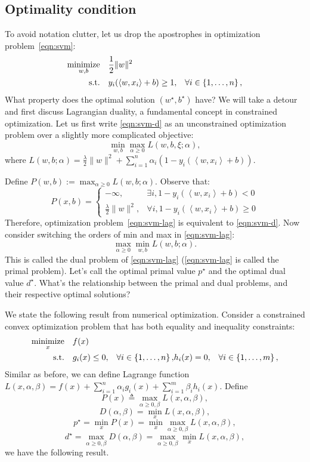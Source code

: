 \documentclass{article}
\DeclareMathOperator*{\minimize}{{\rm minimize}}
\DeclareMathOperator*{\st}{{\rm s.t.}}
\newcommand{\defeq}{\triangleq}
\newcommand{\inner}[2]{\left\langle #1,#2 \right\rangle}
\begin{document}
\subsection{Optimality condition}
To avoid notation clutter, let us drop the apostrophes in optimization problem~\eqref{eqn:svm}:
\begin{align}
  \minimize_{w,b} \quad & \frac12 \| w \|^2 & \label{eqn:svm-d} \\
    \st \quad &  y_i(\inner{w}{x_i} + b) \geq 1, &\forall i \in \cbr{1,\ldots,n}, \nonumber
\end{align}
What property does the optimal solution $(w^\star, b^\star)$ have? We will take a detour and first discuss Lagrangian duality, a fundamental concept in constrained optimization. Let us first write \eqref{eqn:svm-d} as an unconstrained optimization problem over a slightly more complicated objective:
\begin{equation}
   \min_{w,b} \max_{\alpha \geq 0} L(w,b,\xi;\alpha),
   \label{eqn:svm-lag}
\end{equation}
where $L(w,b;\alpha) = \frac \lambda 2 \| w \|^2 + \sum_{i=1}^n \alpha_i (1 - y_i(\inner{w}{x_i} + b))$.

Define $P(w,b) := \max_{\alpha \geq 0} L(w,b;\alpha)$. Observe that:
\[
P(x,b) =
\begin{cases}
-\infty, & \exists i, 1 - y_i(\inner{w}{x_i} + b) < 0 \\
\frac \lambda 2 \| w \|^2, & \forall i, 1 - y_i(\inner{w}{x_i} + b) \geq 0
\end{cases}
\]
Therefore, optimization problem~\eqref{eqn:svm-lag} is equivalent to \eqref{eqn:svm-d}. Now consider switching the orders of min and max in \eqref{eqn:svm-lag}:
\[ \max_{\alpha \geq 0} \min_{w,b} L(w,b;\alpha). \]
This is called the dual problem of \eqref{eqn:svm-lag} (\eqref{eqn:svm-lag} is called the primal problem). Let's call the optimal primal value $p^\star$ and the optimal dual value $d^\star$. What's the relationship between the primal and dual problems, and their respective optimal solutions?

We state the following result from numerical optimization. Consider a constrained convex optimization problem that has both equality and inequality constraints:
\begin{align}
  \minimize_{x} \quad & f(x) & \nonumber \\
    \st \quad & g_i(x) \leq 0, &\forall i \in \cbr{1,\ldots,n}, \nonumber
              & h_i(x) = 0, &\forall i \in \cbr{1,\ldots,m}, \nonumber
\end{align}
Similar as before, we can define Lagrange function $L(x,\alpha,\beta) = f(x) + \sum_{i=1}^n \alpha_i g_i(x) + \sum_{i=1}^m \beta_i h_i(x)$. Define
\[ P(x) \defeq \max_{\alpha \geq 0, \beta} L(x,\alpha,\beta), \]
\[ D(\alpha, \beta) = \min_x L(x,\alpha,\beta), \]
\[ p^\star = \min_x P(x) = \min_x \max_{\alpha \geq 0, \beta} L(x,\alpha,\beta),\]
\[ d^\star = \max_{\alpha \geq 0, \beta} D(\alpha, \beta) = \max_{\alpha \geq 0, \beta} \min_x L(x,\alpha,\beta),\]
we have the following result.
\end{document}
